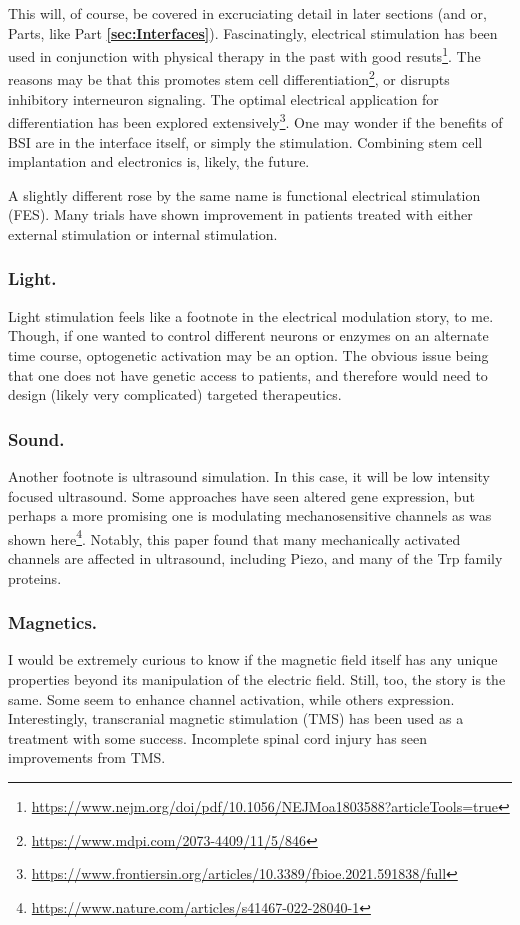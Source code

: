\documentclass[12pt]{report}
\begin{document}
This will, of course, be covered in excruciating detail in later sections (and or, Parts, like Part \textbf{\ref{sec:Interfaces}}). Fascinatingly, electrical stimulation has been used in conjunction with physical therapy in the past with good resuts\footnote{\url{https://www.nejm.org/doi/pdf/10.1056/NEJMoa1803588?articleTools=true}}. The reasons may be that this promotes stem cell differentiation\footnote{\url{https://www.mdpi.com/2073-4409/11/5/846}}, or disrupts inhibitory interneuron signaling. The optimal electrical application for differentiation has been explored extensively\footnote{\url{https://www.frontiersin.org/articles/10.3389/fbioe.2021.591838/full}}. One may wonder if the benefits of BSI are in the interface itself, or simply the stimulation. Combining stem cell implantation and electronics is, likely, the future.\newline

A slightly different rose by the same name is functional electrical stimulation (FES). Many trials have shown improvement in patients treated with either external stimulation or internal stimulation. 

\subsubsection{Light.}
Light stimulation feels like a footnote in the electrical modulation story, to me. Though, if one wanted to control different neurons or enzymes on an alternate time course, optogenetic activation may be an option. The obvious issue being that one does not have genetic access to patients, and therefore would need to design (likely very complicated) targeted therapeutics. 

\subsubsection{Sound.}
Another footnote is ultrasound simulation. In this case, it will be low intensity focused ultrasound. Some approaches have seen altered gene expression, but perhaps a more promising one is modulating mechanosensitive channels as was shown here\footnote{\url{https://www.nature.com/articles/s41467-022-28040-1}}. Notably, this paper found that many mechanically activated channels are affected in ultrasound, including Piezo, and many of the Trp family proteins. 

\subsubsection{Magnetics.}
I would be extremely curious to know if the magnetic field itself has any unique properties beyond its manipulation of the electric field. Still, too, the story is the same. Some seem to enhance channel activation, while others expression. Interestingly, transcranial magnetic stimulation (TMS) has been used as a treatment with some success. Incomplete spinal cord injury has seen improvements from TMS. 
\end{document}
